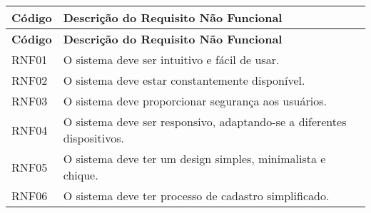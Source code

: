 \begin{longtable}{|p{}|p{}|}
	\hline
	\textbf{Código} & \textbf{Descrição do Requisito Não Funcional} \\
	\hline
	\endfirsthead
	
	\hline
	\textbf{Código} & \textbf{Descrição do Requisito Não Funcional} \\
	\hline
	\endhead
	
	RNF01 & O sistema deve ser intuitivo e fácil de usar. \\ \hline
	RNF02 & O sistema deve estar constantemente disponível. \\ \hline
	RNF03 & O sistema deve proporcionar segurança aos usuários. \\ \hline
	RNF04 & O sistema deve ser responsivo, adaptando-se a diferentes dispositivos. \\ \hline
	RNF05 & O sistema deve ter um design simples, minimalista e chique. \\ \hline
	RNF06 & O sistema deve ter processo de cadastro simplificado. \\ \hline
\end{longtable}

